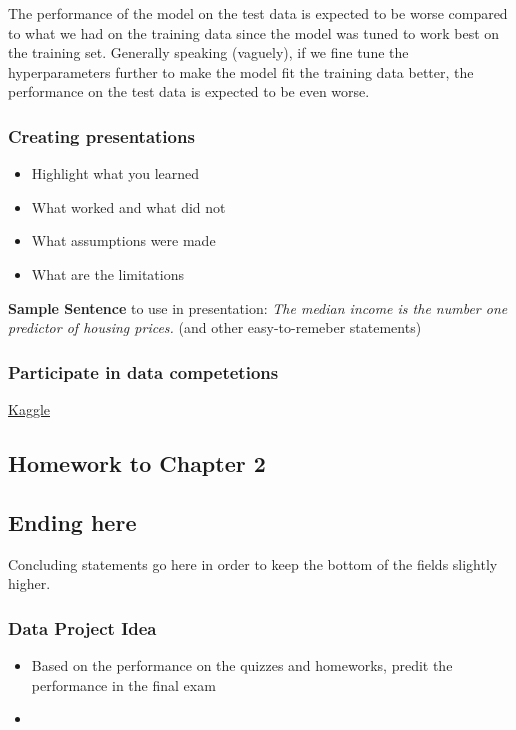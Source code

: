\documentclass[11pt]{article}
\providecommand{\tightlist}{%
      \setlength{\itemsep}{0pt}\setlength{\parskip}{0pt}}
\begin{document}
The performance of the model on the test data is expected to be worse
compared to what we had on the training data since the model was tuned
to work best on the training set. Generally speaking (vaguely), if we
fine tune the hyperparameters further to make the model fit the training
data better, the performance on the test data is expected to be even
worse.

    \hypertarget{creating-presentations}{%
\subsubsection{Creating presentations}\label{creating-presentations}}

\begin{itemize}
\tightlist
\item
  Highlight what you learned
\item
  What worked and what did not
\item
  What assumptions were made
\item
  What are the limitations
\end{itemize}

\textbf{Sample Sentence} to use in presentation: \emph{The median income
is the number one predictor of housing prices.} (and other
easy-to-remeber statements)

    \hypertarget{participate-in-data-competetions}{%
\subsubsection{Participate in data
competetions}\label{participate-in-data-competetions}}

\href{http://www.kaggle.com}{Kaggle}

    \hypertarget{homework-to-chapter-2}{%
\subsection{Homework to Chapter 2}\label{homework-to-chapter-2}}

    \hypertarget{ending-here}{%
\subsection{Ending here}\label{ending-here}}

Concluding statements go here in order to keep the bottom of the fields
slightly higher.

    \hypertarget{data-project-idea}{%
\subsubsection{Data Project Idea}\label{data-project-idea}}

\begin{itemize}
\item
  Based on the performance on the quizzes and homeworks, predit the
  performance in the final exam
\item
\end{itemize}


    
    
    
    
\end{document}
